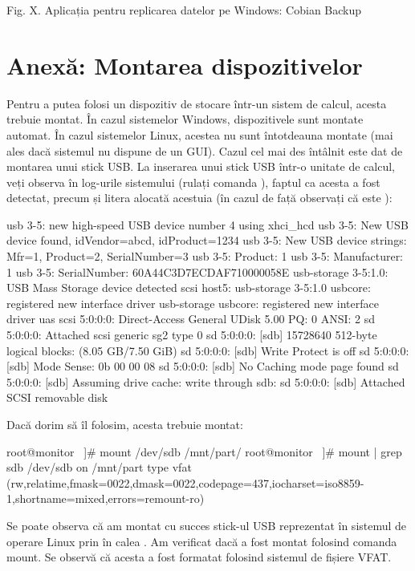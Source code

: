 Fig. X. Aplicația pentru replicarea datelor pe Windows: Cobian Backup

\section{Anexă: Montarea dispozitivelor}
\label{sec:storage-mount}

Pentru a putea folosi un dispozitiv de stocare într-un sistem de calcul, acesta
trebuie montat. În cazul sistemelor Windows, dispozitivele sunt montate automat.
În cazul sistemelor Linux, acestea nu sunt întotdeauna montate (mai ales dacă
sistemul nu dispune de un GUI). Cazul cel mai des întâlnit este dat de montarea
unui stick USB. La inserarea unui stick USB într-o unitate de calcul, veți
observa în log-urile sistemului (rulați comanda ), faptul ca acesta a
fost detectat, precum și litera alocată acestuia (în cazul de față observați că
este ):

\begin{screen}
usb 3-5: new high-speed USB device number 4 using xhci_hcd
usb 3-5: New USB device found, idVendor=abcd, idProduct=1234
usb 3-5: New USB device strings: Mfr=1, Product=2, SerialNumber=3
usb 3-5: Product: 1
usb 3-5: Manufacturer: 1
usb 3-5: SerialNumber: 60A44C3D7ECDAF710000058E
usb-storage 3-5:1.0: USB Mass Storage device detected
scsi host5: usb-storage 3-5:1.0
usbcore: registered new interface driver usb-storage
usbcore: registered new interface driver uas
scsi 5:0:0:0: Direct-Access     General  UDisk            5.00 PQ: 0 ANSI: 2
sd 5:0:0:0: Attached scsi generic sg2 type 0
sd 5:0:0:0: [sdb] 15728640 512-byte logical blocks: (8.05 GB/7.50 GiB)
sd 5:0:0:0: [sdb] Write Protect is off
sd 5:0:0:0: [sdb] Mode Sense: 0b 00 00 08
sd 5:0:0:0: [sdb] No Caching mode page found
sd 5:0:0:0: [sdb] Assuming drive cache: write through
 sdb:
sd 5:0:0:0: [sdb] Attached SCSI removable disk
\end{screen}

Dacă dorim să îl folosim, acesta trebuie montat:

\begin{screen}
root@monitor ~]#  mount /dev/sdb /mnt/part/
root@monitor ~]#  mount | grep sdb
/dev/sdb on /mnt/part type vfat (rw,relatime,fmask=0022,dmask=0022,codepage=437,iocharset=iso8859-1,shortname=mixed,errors=remount-ro)
\end{screen}

Se poate observa că am montat cu succes stick-ul USB reprezentat în sistemul de
operare Linux prin  în calea . Am verificat dacă
a fost montat folosind comanda mount. Se observă că acesta a fost formatat
folosind sistemul de fișiere VFAT.

